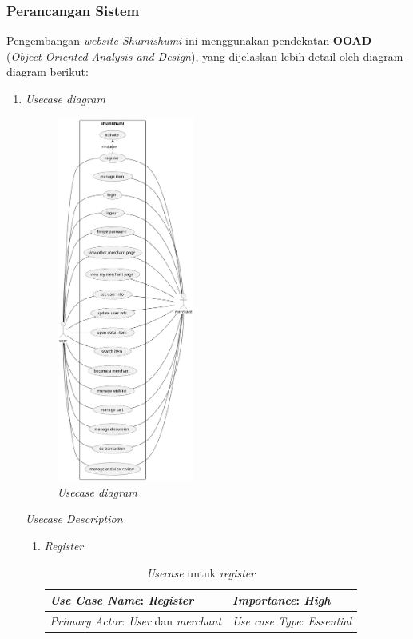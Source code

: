 \documentclass[a4paper]{article}
\newcommand{\subsubbab}[1]{%
    \subsubsection{#1}%
}
\begin{document}
\subsubbab{Perancangan Sistem}
Pengembangan \textit{website Shumishumi} ini menggunakan pendekatan \textbf{OOAD} (\textit{Object Oriented Analysis and Design}), yang dijelaskan lebih detail oleh diagram-diagram berikut:
\newpage
\begin{enumerate}
    \item \textit{Usecase diagram}
    \begin{figure}[h]
        \centering
        \includegraphics*[height=12cm]{diagram/usecase diagram/usecase diagram.png}
        \caption{\textit{Usecase diagram}}
    \end{figure}
    \newpage
    \textit{Usecase Description}
    \begin{enumerate}
        \item \textit{Register}\\
        \begin{table}[h]
            \centering
            \caption{\textit{Usecase} untuk \textit{register}}
            \begin{tabular}{|lll}
            \hline
            \multicolumn{1}{|l|}{\textit{Use Case Name}: \textit{Register}}             & \multicolumn{2}{l|}{\textit{Importance}: \textit{High}}   \\ \hline
            \multicolumn{1}{|l|}{\textit{Primary Actor}: \textit{User} dan \textit{merchant}}             & \multicolumn{2}{l|}{\textit{Use case Type}: \textit{Essential}} \\ \hline

\end{tabular}
\end{table}
\end{enumerate}
\end{enumerate}
\end{document}
